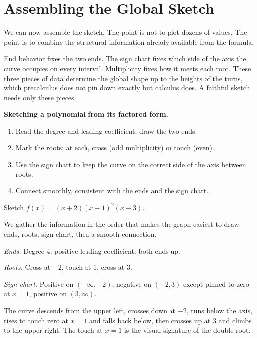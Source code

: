 \documentclass[12pt]{book}
\begin{document}
\section{Assembling the Global Sketch}

We can now assemble the sketch. The point is not to plot dozens of values. The point
is to combine the structural information already available from the formula.

End behavior fixes the two ends. The sign chart fixes which side of the axis the
curve occupies on every interval. Multiplicity fixes how it meets each root. These
three pieces of data determine the global shape up to the heights of the turns,
which precalculus does not pin down exactly but calculus does. A faithful sketch
needs only these pieces.

\begin{keyidea}
\textbf{Sketching a polynomial from its factored form.}
\begin{enumerate}\setlength{\itemsep}{2pt}
  \item Read the degree and leading coefficient; draw the two ends.
  \item Mark the roots; at each, cross (odd multiplicity) or touch (even).
  \item Use the sign chart to keep the curve on the correct side of the axis between
        roots.
  \item Connect smoothly, consistent with the ends and the sign chart.
\end{enumerate}
\end{keyidea}

\begin{example}
Sketch $f(x)=(x+2)(x-1)^2(x-3)$.

We gather the information in the order that makes the graph easiest to draw: ends,
roots, sign chart, then a smooth connection.

\emph{Ends.} Degree $4$, positive leading coefficient: both ends up.

\emph{Roots.} Cross at $-2$, touch at $1$, cross at $3$.

\emph{Sign chart.} Positive on $(-\infty,-2)$, negative on $(-2,3)$ except pinned to
zero at $x=1$, positive on $(3,\infty)$.

The curve descends from the upper left, crosses down at $-2$, runs below the axis,
rises to touch zero at $x=1$ and falls back below, then crosses up at $3$ and climbs
to the upper right. The touch at $x=1$ is the visual signature of the double root.
\end{example}
\end{document}

